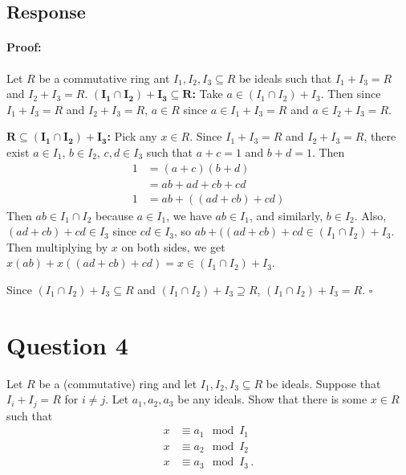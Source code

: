 \documentclass [12pt] {article}
\newenvironment{proof}{\paragraph{Proof:}}{\hfill$\square$}
\renewcommand{\bf}[1]{\textbf{{#1}}}
\begin{document}
\subsection*{Response}
\begin{proof}
Let $R$ be a commutative ring ant $I_1, I_2, I_3 \subseteq R$ be ideals such that $I_1 + I_3 = R$
and $I_2 + I_3 = R$. 
\bf{$\bm{(I_1 \cap I_2) + I_3 \subseteq R}$:}
Take $a \in (I_1 \cap I_2) + I_3$. Then since $I_1 + I_3 = R$ and $I_2 + I_3 = R$, $a \in R$ since
$a \in I_1 + I_3 = R$ and $a \in I_2 + I_3 = R$.
\vspace{1em}

\bf{$\bm{R \subseteq (I_1 \cap I_2) + I_3 }$:}
Pick any $x \in R$. Since $I_1 + I_3 = R$ and $I_2 + I_3 = R$, there exist $a \in I_1$, $b \in I_2$, 
$c, d \in I_3$ such that $a + c = 1$ and $b + d = 1$. Then
\begin{align*}
    1 &= (a + c)(b + d) \\
      &= ab + ad + cb + cd \\
    1 &= ab + ((ad + cb) + cd)
\end{align*}
Then $ab \in I_1 \cap I_2$ because $a \in I_1$, we have $ab \in I_1$, and similarly, $b \in I_2$. 
Also, $(ad + cb) + cd \in I_3$ since $cd \in I_3$, so 
$ab + ((ad + cb) + cd \in (I_1 \cap I_2) + I_3$. Then multiplying by $x$ on both sides,
we get $x(ab) + x((ad + cb) + cd) = x \in (I_1 \cap I_2) + I_3$.
\vspace{1em}

Since $(I_1 \cap I_2) + I_3 \subseteq R$ and $(I_1 \cap I_2) + I_3 \supseteq R$, 
$(I_1 \cap I_2) + I_3 = R$.
\end{proof}

\newpage
\section*{Question 4}
Let $R$ be a (commutative) ring and let $I_1,I_2,I_3\subseteq R$ be ideals. Suppose that $I_i+I_j=R$
for $i\neq j$. Let $a_1,a_2,a_3$ be any ideals. Show that there is some $x\in R$ such that 
\begin{align*}
    x &\equiv a_1\mod I_1 \\
    x &\equiv a_2\mod I_2 \\ 
    x &\equiv a_3\mod I_3\,.
\end{align*}
\end{document}

